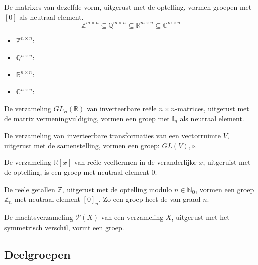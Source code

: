 \documentclass[main.tex]{subfiles}
\begin{document}
\begin{vb}
  De matrixes van dezelfde vorm, uitgerust met de optelling, vormen groepen met $[0]$ als neutraal element.
  \[ \mathbb{Z}^{m \times n} \subseteq \mathbb{Q}^{m \times n} \subseteq \mathbb{R}^{m \times n} \subseteq \mathbb{C}^{m \times n} \]
  \begin{itemize}
  \item $\mathbb{Z}^{n \times n}$: 
  \item $\mathbb{Q}^{n \times n}$: \cycln
  \item $\mathbb{R}^{n \times n}$: \cycln
  \item $\mathbb{C}^{n \times n}$: \cycln
  \end{itemize}
\commn
\end{vb}

\begin{vb}
  De verzameling $GL_{n}(\mathbb{R})$ van inverteerbare re\"ele $n\times n$-matrices, uitgerust met de matrix vermeningvuldiging, vormen een groep met $\mathbb{I}_{n}$ als neutraal element.\\
\commn \cycln
\end{vb}

\begin{vb}
  De verzameling van inverteerbare transformaties van een vectorruimte $V$, uitgerust met de samenstelling, vormen een groep: $GL(V),\circ$.
\commn \cycln
\end{vb}

\begin{vb}
  De verzameling $\mathbb{R}[x]$ van re\"ele veeltermen in de veranderlijke $x$, uitgeruist met de optelling, is een groep met neutraal element $0$.\\
\commj \cycln
\end{vb}

\begin{vb}
  De re\"ele getallen $\mathbb{Z}$, uitgerust met de optelling modulo $n\in \mathbb{N}_{0}$, vormen een groep $\mathbb{Z}_{n}$ met neutraal element $[0]_{n}$. Zo een groep heet de  van graad $n$.\\
\commj {}
\end{vb}

\begin{vb}
  De machtsverzameling $\mathcal{P}(X)$ van een verzameling $X$, uitgerust met het symmetrisch verschil, vormt een groep.
\commj \cycln
\end{vb}

\subsection{Deelgroepen}
\label{sec:deelgroepen}
\end{document}
